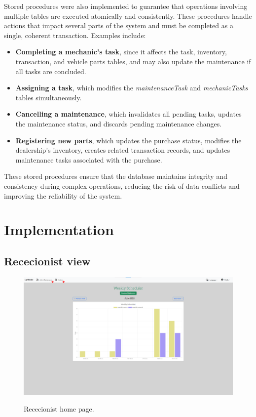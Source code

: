 Stored procedures were also implemented to guarantee that operations involving multiple tables are executed atomically and consistently. These procedures handle actions that impact several parts of the system and must be completed as a single, coherent transaction. Examples include:

\begin{itemize}
  \item \textbf{Completing a mechanic's task}, since it affects the task, inventory, transaction, and vehicle parts tables, and may also update the maintenance if all tasks are concluded.
  \item \textbf{Assigning a task}, which modifies the \textit{maintenanceTask} and \textit{mechanicTasks} tables simultaneously.
  \item \textbf{Cancelling a maintenance}, which invalidates all pending tasks, updates the maintenance status, and discards pending maintenance changes.
  \item \textbf{Registering new parts}, which updates the purchase status, modifies the dealership's inventory, creates related transaction records, and updates maintenance tasks associated with the purchase.
\end{itemize}

These stored procedures ensure that the database maintains integrity and consistency during complex operations, reducing the risk of data conflicts and improving the reliability of the system.




\section{Implementation}

\subsection{Rececionist view}



\begin{figure}[h]
  \caption{Rececionist home page.}
  \centering
  \includegraphics[width=\textwidth]{figs/Implementation/rececionist/rececionistHomePage}
  \label{fig:impReceHome}
\end{figure}

